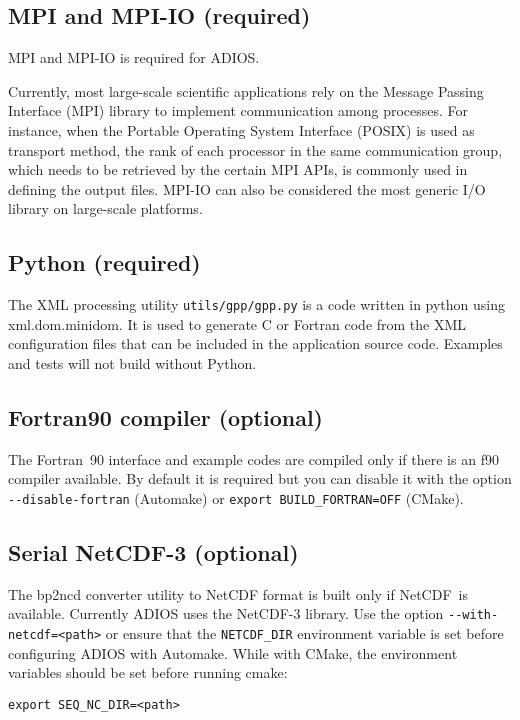 \subsection{MPI and MPI-IO (required)}

MPI and MPI-IO is required for ADIOS.

Currently, most large-scale scientific applications rely on the Message Passing 
Interface (MPI) library to implement communication among processes. For instance, 
when the Portable Operating System Interface (POSIX) is used as transport method, 
the rank of each processor in the same communication group, which needs to be retrieved 
by the certain MPI APIs, is commonly used in defining the output files. MPI-IO 
can also be considered the most generic I/O library on large-scale platforms. 

\subsection{Python (required)}

The XML processing utility \verb+utils/gpp/gpp.py+ is a code written in python using xml.dom.minidom. 
It is used to generate C or Fortran code from the XML configuration files that 
can be included in the application source code.  Examples and tests will not build 
without Python. 

\subsection{Fortran90 compiler (optional)}

The Fortran~90 interface and example codes are compiled only if there is an f90 
compiler available. By default it is required but you can disable it with the option 
\verb+--disable-fortran+ (Automake) or \verb+export BUILD_FORTRAN=OFF+ (CMake).

\subsection{Serial NetCDF-3 (optional)}

The bp2ncd converter utility to NetCDF format is built only if NetCDF~is available. 
 Currently ADIOS uses the NetCDF-3 library. Use the option \verb+--with-netcdf=<path>+ 
or ensure that the \verb+NETCDF_DIR+ environment variable is set before configuring ADIOS with Automake.
While with CMake, the environment variables should be set before running cmake:
\begin{lstlisting}
export SEQ_NC_DIR=<path>
\end{lstlisting}

